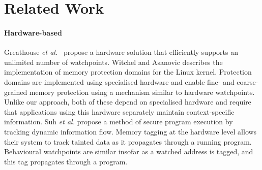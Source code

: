 \documentclass[letterpaper,twocolumn,10pt]{article}
\begin{document}











\section{Related Work}

\paragraph{Hardware-based}
Greathouse \emph{et al.}~\cite{UnlimitedWatchpoints} propose a hardware solution that efficiently supports an unlimited number of watchpoints. Witchel and Asanovic \cite{Mondrix} describes the implementation of memory protection domains for the Linux kernel. Protection domains are implemented using specialised hardware and enable fine- and coarse-grained memory protection using a mechanism similar to hardware watchpoints. Unlike our approach, both of these depend on specialised hardware and require that applications using this hardware  separately maintain context-specific information. Suh \emph{et al.} \cite{SecureProgramExecFlowTracking} propose a method of secure program execution by tracking dynamic information flow. Memory tagging at the hardware level allows their system to track tainted data as it propagates through a running program. Behavioural watchpoints are similar insofar as a watched address is tagged, and this tag propagates through a program.
\end{document}
